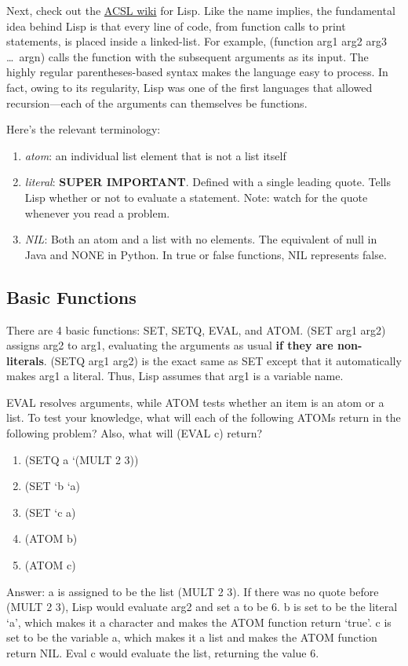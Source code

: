 \documentclass[10pt]{article}
\begin{document}
Next, check out the \href{http://www.categories.acsl.org/wiki/index.php?title=LISP}{ACSL wiki} for Lisp.
Like the name implies, the fundamental idea behind Lisp is that every
line of code, from function calls to print statements,
is placed inside a linked-list.
For example, (function arg1 arg2 arg3 \ldots~argn)
calls the function with the subsequent arguments as its input.
The highly regular parentheses-based syntax makes the language
easy to process.
In fact, owing to its regularity, Lisp was one of the first languages
that allowed recursion---each of the arguments can themselves
be functions.

Here's the relevant terminology:
\begin{enumerate}
    \item \textit{atom}: an individual list element that is not a list itself
    \item \textit{literal}: \textbf{SUPER IMPORTANT}.
    Defined with a single leading quote.
    Tells Lisp whether or not to evaluate a statement.
    Note: watch for the quote whenever you read a problem.
    \item \textit{NIL}: Both an atom and a list with no elements.
    The equivalent of null in Java and NONE in Python.
    In true or false functions, NIL represents false.
\end{enumerate}

\subsection{Basic Functions}
There are 4 basic functions: SET, SETQ, EVAL, and ATOM.
(SET arg1 arg2) assigns arg2 to arg1, evaluating the arguments as usual
\textbf{if they are non-literals}.
(SETQ arg1 arg2) is the exact same as SET except that it automatically makes arg1
a literal.
Thus, Lisp assumes that arg1 is a variable name.

EVAL resolves arguments, while ATOM tests whether an item is an atom or a list.
To test your knowledge, what will each of the following ATOMs return in
the following problem?
Also, what will (EVAL c) return?
\begin{enumerate}
    \item (SETQ a `(MULT 2 3))
    \item (SET `b `a)
    \item (SET `c a)
    \item (ATOM b)
    \item (ATOM c)
\end{enumerate}
Answer: a is assigned to be the list (MULT 2 3).
If there was no quote before (MULT 2 3), Lisp would evaluate arg2 and set
a to be 6.
b is set to be the literal `a', which makes it a character and makes
the ATOM function return `true'.
c is set to be the variable a, which makes it a list and makes the ATOM function
return NIL.
Eval c would evaluate the list, returning the value 6.
\end{document}
